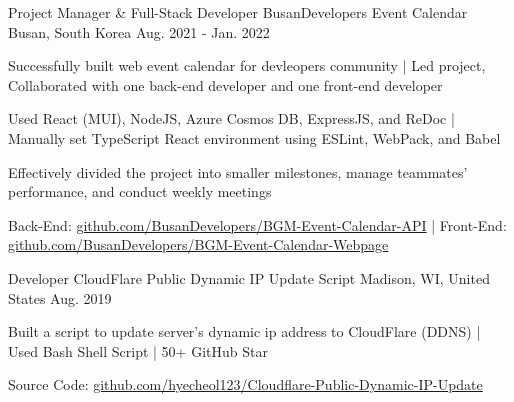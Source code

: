 

\begin{cventries}

  \cventry
  {Project Manager \& Full-Stack Developer} %
  {BusanDevelopers Event Calendar} %
  {Busan, South Korea} %
  {Aug. 2021 - Jan. 2022} %
  {
    \begin{cvitems} %
      \item {Successfully built web event calendar for devleopers community | Led project, Collaborated with one back-end developer and one front-end developer}
      \item {Used React (MUI), NodeJS, Azure Cosmos DB, ExpressJS, and ReDoc | Manually set TypeScript React environment using ESLint, WebPack, and Babel}
      \item {Effectively divided the project into smaller milestones, manage teammates' performance, and conduct weekly meetings}
      \item {
                  \color{text} Back-End: \color{awesome}\underline{github.com/BusanDevelopers/BGM-Event-Calendar-API} \color{text} | Front-End: \color{awesome}\underline{github.com/BusanDevelopers/BGM-Event-Calendar-Webpage}
            }
    \end{cvitems}
  }

  \cventry
  {Developer} %
  {CloudFlare Public Dynamic IP Update Script} %
  {Madison, WI, United States} %
  {Aug. 2019} %
  {
    \begin{cvitems} %
      \item {Built a script to update server's dynamic ip address to CloudFlare (DDNS) | Used Bash Shell Script | 50+ GitHub Star}
      \item {Source Code: \color{awesome}\underline{github.com/hyecheol123/Cloudflare-Public-Dynamic-IP-Update}}
    \end{cvitems}
  }

\end{cventries}
